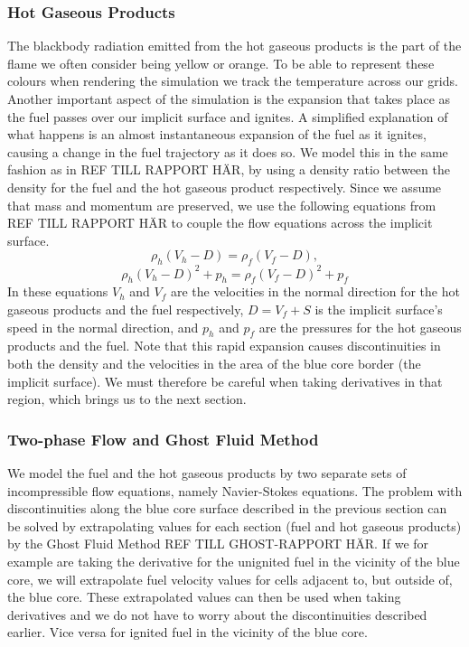 \subsubsection{Hot Gaseous Products}
The blackbody radiation emitted from the hot gaseous products is the part of the flame we often consider being yellow or orange. To be able to represent these colours when rendering the simulation we track the temperature across our grids. Another important aspect of the simulation is the expansion that takes place as the fuel passes over our implicit surface and ignites. A simplified explanation of what happens is an almost instantaneous expansion of the fuel as it ignites, causing a change in the fuel trajectory as it does so. We model this in the same fashion as in REF TILL RAPPORT HÄR, by using a density ratio between the density for the fuel and the hot gaseous product respectively. Since we assume that mass and momentum are preserved, we use the following equations from REF TILL RAPPORT HÄR to couple the flow equations across the implicit surface.
\begin{equation}
\rho_h(V_h-D) = \rho_f(V_f-D),
\end{equation}
\begin{equation}
\rho_h(V_h-D)^2+p_h = \rho_f(V_f-D)^2+p_f
\end{equation}
In these equations $V_h$ and $V_f$ are the velocities in the normal direction for the hot gaseous products and the fuel respectively, $D = V_f+S$ is the implicit surface's speed in the normal direction, and $p_h$ and $p_f$ are the pressures for the hot gaseous products and the fuel. Note that this rapid expansion causes discontinuities in both the density and the velocities in the area of the blue core border (the implicit surface). We must therefore be careful when taking derivatives in that region, which brings us to the next section.
\subsubsection{Two-phase Flow and Ghost Fluid Method}
We model the fuel and the hot gaseous products by two separate sets of incompressible flow equations, namely Navier-Stokes equations. The problem with discontinuities along the blue core surface described in the previous section can be solved by extrapolating values for each section (fuel and hot gaseous products) by the Ghost Fluid Method REF TILL GHOST-RAPPORT HÄR. If we  for example are taking the derivative for the unignited fuel in the vicinity of the blue core, we will extrapolate fuel velocity values for cells adjacent to, but outside of, the blue core. These extrapolated values can then be used when taking derivatives and we do not have to worry about the discontinuities described earlier. Vice versa for ignited fuel in the vicinity of the blue core.